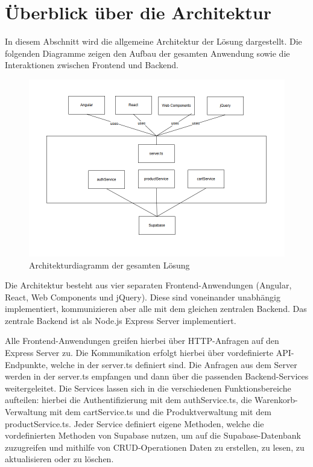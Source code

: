 \documentclass[oneside]{ausarbeitung}
\begin{document}
\section{Überblick über die Architektur}
\label{sec:architektur}

In diesem Abschnitt wird die allgemeine Architektur der Lösung dargestellt. Die folgenden Diagramme zeigen den Aufbau der gesamten Anwendung sowie die Interaktionen zwischen Frontend und Backend.

\begin{figure}[H]
    \centering
    \includegraphics[width=\textwidth]{images/architekturdiagramm}
    \caption{Architekturdiagramm der gesamten Lösung}
    \label{fig:architekturdiagramm}
\end{figure}

Die Architektur besteht aus vier separaten Frontend-Anwendungen (Angular, React, Web Components und jQuery). Diese sind voneinander unabhängig implementiert, kommunizieren aber alle mit dem gleichen zentralen Backend. Das zentrale Backend ist als Node.js Express Server implementiert.

Alle Frontend-Anwendungen greifen hierbei über HTTP-Anfragen auf den Express Server zu. Die Kommunikation erfolgt hierbei über vordefinierte API-Endpunkte, welche in der server.ts definiert sind. Die Anfragen aus dem Server werden in der server.ts empfangen und dann über die passenden Backend-Services weitergeleitet. Die Services lassen sich in die verschiedenen Funktionsbereiche aufteilen: hierbei die Authentifizierung mit dem authService.ts, die Warenkorb-Verwaltung mit dem cartService.ts und die Produktverwaltung mit dem productService.ts. Jeder Service definiert eigene Methoden, welche die vordefinierten Methoden von Supabase nutzen, um auf die Supabase-Datenbank zuzugreifen und mithilfe von CRUD-Operationen Daten zu erstellen, zu lesen, zu aktualisieren oder zu löschen.
\end{document}
